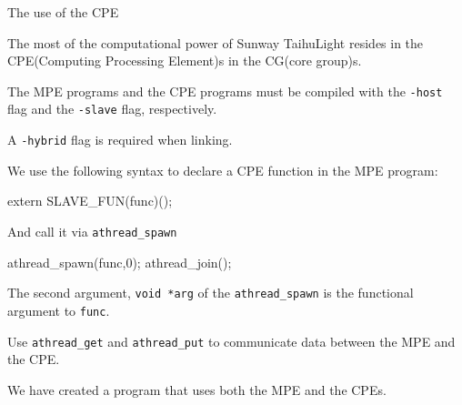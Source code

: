 The use of the CPE

The most of the computational power of Sunway TaihuLight resides in the
CPE(Computing Processing Element)s in the
CG(core group)s.


The MPE programs and the CPE programs must be compiled with
the \verb`-host` flag and
the \verb`-slave` flag, respectively.

A
\verb`-hybrid`
flag is required when linking.

We use the following syntax
to declare a
CPE function in the
MPE program:


\begin{code}
extern SLAVE_FUN(func)();
\end{code}

And call it via
\verb`athread_spawn`

\begin{code}
athread_spawn(func,0);
athread_join();
\end{code}

The second argument, \verb`void *arg` of the
\verb`athread_spawn` is the functional argument to \verb`func`.


Use \verb`athread_get` and \verb`athread_put` to communicate data between the MPE and the CPE.





We have created a program that uses both the MPE and the CPEs.
